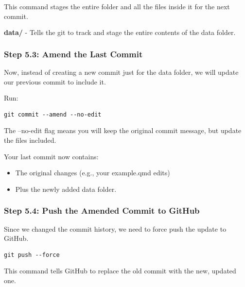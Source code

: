 \documentclass[
  11pt,
  a4paper,
]{article}
\begin{document}
This command stages the entire folder and all the files inside it for
the next commit.

\textbf{data/} - Tells the git to track and stage the entire contents of
the data folder.

\subsubsection{Step 5.3: Amend the Last
Commit}\label{step-5.3-amend-the-last-commit}

Now, instead of creating a new commit just for the data folder, we will
update our previous commit to include it.

Run:

\begin{verbatim}
git commit --amend --no-edit
\end{verbatim}

The --no-edit flag means you will keep the original commit message, but
update the files included.

Your last commit now contains:

\begin{itemize}
\item
  The original changes (e.g., your example.qmd edits)
\item
  Plus the newly added data folder.
\end{itemize}

\subsubsection{Step 5.4: Push the Amended Commit to
GitHub}\label{step-5.4-push-the-amended-commit-to-github}

Since we changed the commit history, we need to force push the update to
GitHub.

\begin{verbatim}
git push --force
\end{verbatim}

This command tells GitHub to replace the old commit with the new,
updated one.
\end{document}
